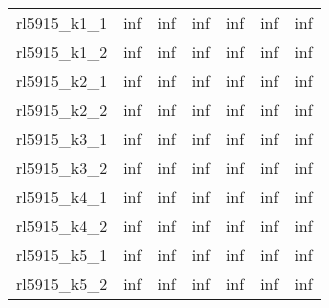 \documentclass{article}
\begin{document}
\begin{center}
\begin{tabular}{|l|c|c|c|c|c|c|}
rl5915\_k1\_1 & inf & inf & inf & inf & inf & inf \\
rl5915\_k1\_2 & inf & inf & inf & inf & inf & inf \\
rl5915\_k2\_1 & inf & inf & inf & inf & inf & inf \\
rl5915\_k2\_2 & inf & inf & inf & inf & inf & inf \\
rl5915\_k3\_1 & inf & inf & inf & inf & inf & inf \\
rl5915\_k3\_2 & inf & inf & inf & inf & inf & inf \\
rl5915\_k4\_1 & inf & inf & inf & inf & inf & inf \\
rl5915\_k4\_2 & inf & inf & inf & inf & inf & inf \\
rl5915\_k5\_1 & inf & inf & inf & inf & inf & inf \\
rl5915\_k5\_2 & inf & inf & inf & inf & inf & inf \\
\hline
\end{tabular}
\end{center}
\end{document}
